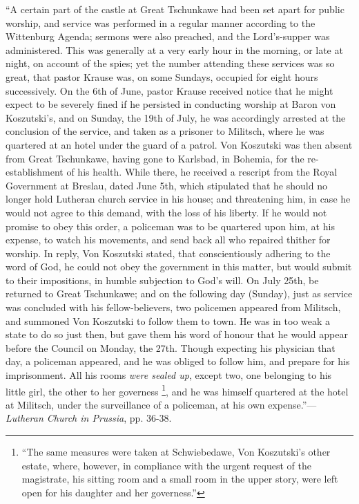 ``A certain part of the castle at
Great Tschunkawe had been set apart for public worship, and service was
performed in a regular manner according to the Wittenburg Agenda;
sermons were also preached, and the Lord's-supper was administered. This
was generally at a very early hour in the morning, or late at night, on
account of the spies; yet the number attending these services was so
great, that pastor Krause was, on some Sundays, occupied for eight hours
successively. On the 6th of June, pastor Krause received notice that he
might expect to be severely fined if he persisted in conducting worship
at Baron von Koszutski's, and on Sunday, the 19th of July, he was
accordingly arrested at the conclusion of the service, and taken as a
prisoner to Militsch, where he was quartered at an hotel under the guard
of a patrol. Von Koszutski was then absent from Great Tschunkawe, having
gone to Karlsbad, in Bohemia, for the re-establishment of his health.
While there, he received a rescript from the Royal Government at
Breslau, dated June 5th, which stipulated that he should no longer hold
Lutheran church service in his house; and threatening him, in case he
would not agree to this demand, with the loss of his liberty. If he
would not promise to obey this order, a policeman was to be quartered
upon him, at his expense, to watch his movements, and send back all who
repaired thither for worship. In reply, Von Koszutski stated, that
conscientiously adhering to the word of God, he could not obey the
government in this matter, but would submit to their impositions, in
humble subjection to God's will. On July 25th, be returned to Great
Tschunkawe; and on the following day (Sunday), just as service was
concluded with his fellow-believers, two policemen appeared from
Militsch, and summoned Von Koszutski to follow them to town. He was in
too weak a state to do so just then, but gave them his word of honour
that he would appear before the Council on Monday, the 27th. Though
expecting his physician that day, a policeman appeared, and he was
obliged to follow him, and prepare for his imprisonment. All his rooms \emph{were
sealed up}, except two, one belonging to his little girl, the other
to her governess \footnote{``The same measures were taken at Schwiebedawe, Von Koszutski's other
estate, where, however, in compliance with the urgent request of the
magistrate, his sitting room and a small room in the upper story, were
left open for his daughter and her governess.''},
and he was himself quartered at the hotel at Militsch, under the
surveillance of a policeman, at his own
expense.''—\emph{Lutheran Church in Prussia}, pp. 36-38.

